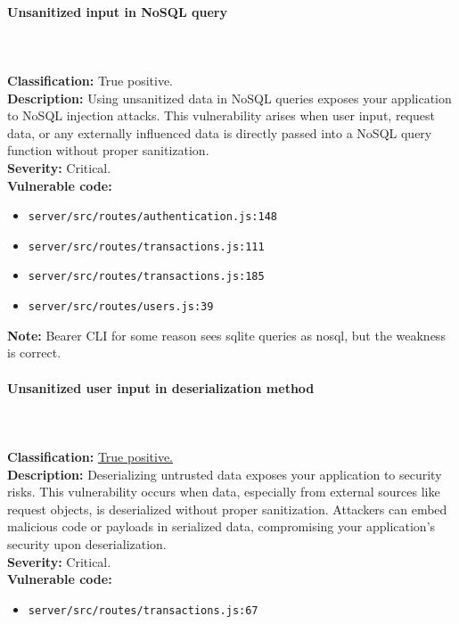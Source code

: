 \documentclass[]{article}
\begin{document}
\paragraph{Unsanitized input in NoSQL query} \mbox{} \\ \\
\textbf{Classification:} True positive. \\
\textbf{Description:} Using unsanitized data in NoSQL queries exposes your application to NoSQL injection attacks. This vulnerability arises when user input, request data, or any externally influenced data is directly passed into a NoSQL query function without proper sanitization. \\
\textbf{Severity:} Critical. \\ 
\textbf{Vulnerable code:}
\begin{itemize}
    \item \texttt{server/src/routes/authentication.js:148}
    \item \texttt{server/src/routes/transactions.js:111}
    \item \texttt{server/src/routes/transactions.js:185}
    \item \texttt{server/src/routes/users.js:39}
\end{itemize}
\textbf{Note:} Bearer CLI for some reason sees sqlite queries as nosql, but the weakness is correct.

\paragraph{Unsanitized user input in deserialization method} \mbox{} \\ \\
\textbf{Classification:} \hyperref[subsubsec:deserialization_of_untrusted_data]{True positive.} \\
\textbf{Description:} Deserializing untrusted data exposes your application to security risks. This vulnerability occurs when data, especially from external sources like request objects, is deserialized without proper sanitization. Attackers can embed malicious code or payloads in serialized data, compromising your application's security upon deserialization. \\ 
\textbf{Severity:} Critical. \\ 
\textbf{Vulnerable code:}
\begin{itemize}
    \item \texttt{server/src/routes/transactions.js:67}
\end{itemize}
\end{document}
